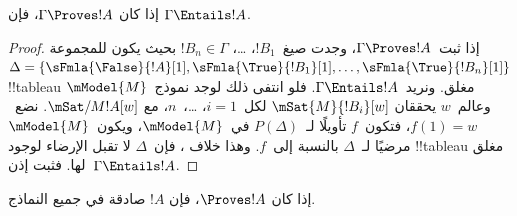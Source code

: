 \documentclass[../../../include/open-logic-section]{subfiles}
\begin{document}
\begin{cor}
إذا كان $\Gamma \Proves !A$، فإن $\Gamma \Entails !A$.
\end{cor}

\begin{proof}
  إذا ثبت~$\Gamma \Proves !A$، وجدت صيغ~$!B_1$، \dots، $!B_n \in
  \Gamma$ بحيث يكون للمجموعة~$\Delta = \{\sFmla{\False}{!A}[1],
  \sFmla{\True}{!B_1}[1], \dots, \sFmla{\True}{!B_n}[1]\}$
  !!{tableau} مغلق. ونريد~$\Gamma \Entails !A$.
  فلو انتفى ذلك لوجد نموذج~$\mModel{M}$ وعالم~$w$ يحققان
  $\mSat{M}{!B_i}[w]$ لكل~$i=1$، \dots،~$n$، مع
  $\mSat/{M}{!A}[w]$. نضع~$f(1) = w$، فتكون~$f$ تأويلًا
  لـ~$P(\Delta)$ في~$\mModel{M}$، ويكون~$\mModel{M}$ مرضيًا
  لـ~$\Delta$ بالنسبة إلى~$f$. وهذا خلاف
  ، فإن~$\Delta$ لا تقبل الإرضاء لوجود
  !!{tableau} مغلق لها. فثبت إذن~$\Gamma \Entails !A$.
\end{proof}

\begin{cor}
إذا كان $\Proves !A$، فإن $!A$ صادقة في جميع النماذج.
\end{cor}
\end{document}
